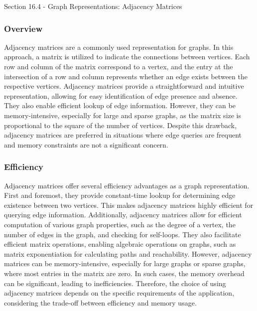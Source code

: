 \begin{notes}{Section 16.4 - Graph Representations: Adjacency Matrices}
    \subsubsection*{Overview}

    Adjacency matrices are a commonly used representation for graphs. In this approach, a matrix is utilized to indicate the connections between vertices. Each row and column of the matrix correspond to a vertex, and 
    the entry at the intersection of a row and column represents whether an edge exists between the respective vertices. Adjacency matrices provide a straightforward and intuitive representation, allowing for easy 
    identification of edge presence and absence. They also enable efficient lookup of edge information. However, they can be memory-intensive, especially for large and sparse graphs, as the matrix size is proportional 
    to the square of the number of vertices. Despite this drawback, adjacency matrices are preferred in situations where edge queries are frequent and memory constraints are not a significant concern.
    
    \subsubsection*{Efficiency}
    
    Adjacency matrices offer several efficiency advantages as a graph representation. First and foremost, they provide constant-time lookup for determining edge existence between two vertices. This makes adjacency matrices 
    highly efficient for querying edge information. Additionally, adjacency matrices allow for efficient computation of various graph properties, such as the degree of a vertex, the number of edges in the graph, and checking 
    for self-loops. They also facilitate efficient matrix operations, enabling algebraic operations on graphs, such as matrix exponentiation for calculating paths and reachability. However, adjacency matrices can be 
    memory-intensive, especially for large graphs or sparse graphs, where most entries in the matrix are zero. In such cases, the memory overhead can be significant, leading to inefficiencies. Therefore, the choice of using 
    adjacency matrices depends on the specific requirements of the application, considering the trade-off between efficiency and memory usage.
\end{notes}

